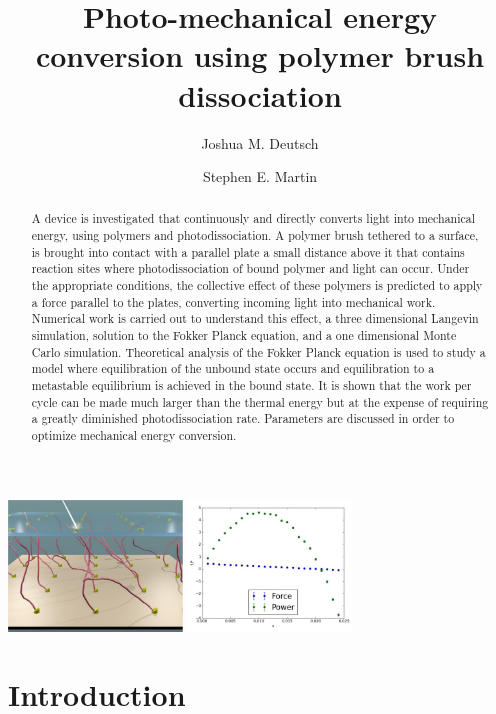 \documentclass[journal = mamobx, manuscript = article]{achemso}
\author{Joshua M. Deutsch}
\author{Stephen E. Martin}
\affiliation[UCSC]
{Department of Physics, University of California, Santa Cruz CA 95064}
\title[title]
{Photo-mechanical energy conversion using polymer brush dissociation}
\begin{document}
\begin{tocentry}
\includegraphics[height = 1.375in]{TOC2}
\includegraphics[height = 1.375in]{4040per_TOC}
\end{tocentry}

\begin{abstract}
A device is investigated that continuously and directly converts
light into mechanical energy, using polymers and photodissociation.
A polymer brush tethered to a surface, is brought into contact with a parallel
plate a small distance above it that contains reaction sites where
photodissociation of bound polymer and light can occur. Under the
appropriate conditions, the collective effect of these polymers is
predicted to apply a force parallel to the plates, converting
incoming light into mechanical work. Numerical work is carried out
to understand this effect, a three dimensional Langevin simulation,
solution to the Fokker Planck equation, and a one dimensional Monte
Carlo simulation.  Theoretical analysis of the Fokker Planck equation
is used to study a model where equilibration of the unbound state
occurs and equilibration to a metastable equilibrium is achieved
in the bound state. It is shown that the work per cycle can be made
much larger than the thermal energy but at the expense of requiring
a greatly diminished photodissociation rate. Parameters
are discussed in order to optimize mechanical energy conversion.
\end{abstract}
\maketitle

\section{Introduction}
\label{sec:Introduction}
\end{document}

